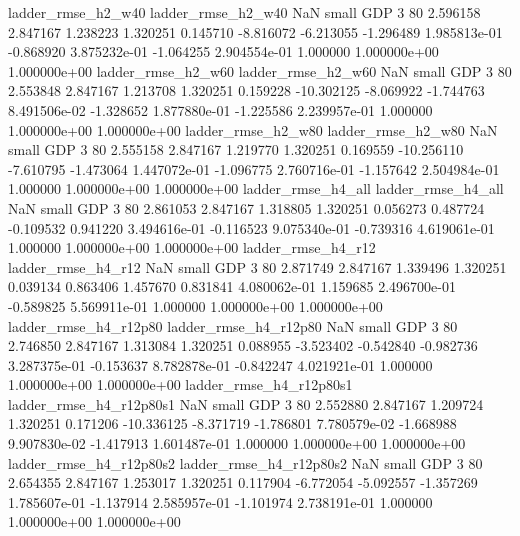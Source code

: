       ladder_rmse_h2_w40       ladder_rmse_h2_w40                   NaN      small      GDP                 3 80 2.596158       2.847167 1.238223       1.320251    0.145710     -8.816072     -6.213055    -1.296489   1.985813e-01 -0.868920 3.875232e-01    -1.064255   2.904554e-01            1.000000    1.000000e+00        1.000000e+00
      ladder_rmse_h2_w60       ladder_rmse_h2_w60                   NaN      small      GDP                 3 80 2.553848       2.847167 1.213708       1.320251    0.159228    -10.302125     -8.069922    -1.744763   8.491506e-02 -1.328652 1.877880e-01    -1.225586   2.239957e-01            1.000000    1.000000e+00        1.000000e+00
      ladder_rmse_h2_w80       ladder_rmse_h2_w80                   NaN      small      GDP                 3 80 2.555158       2.847167 1.219770       1.320251    0.169559    -10.256110     -7.610795    -1.473064   1.447072e-01 -1.096775 2.760716e-01    -1.157642   2.504984e-01            1.000000    1.000000e+00        1.000000e+00
      ladder_rmse_h4_all       ladder_rmse_h4_all                   NaN      small      GDP                 3 80 2.861053       2.847167 1.318805       1.320251    0.056273      0.487724     -0.109532     0.941220   3.494616e-01 -0.116523 9.075340e-01    -0.739316   4.619061e-01            1.000000    1.000000e+00        1.000000e+00
      ladder_rmse_h4_r12       ladder_rmse_h4_r12                   NaN      small      GDP                 3 80 2.871749       2.847167 1.339496       1.320251    0.039134      0.863406      1.457670     0.831841   4.080062e-01  1.159685 2.496700e-01    -0.589825   5.569911e-01            1.000000    1.000000e+00        1.000000e+00
   ladder_rmse_h4_r12p80    ladder_rmse_h4_r12p80                   NaN      small      GDP                 3 80 2.746850       2.847167 1.313084       1.320251    0.088955     -3.523402     -0.542840    -0.982736   3.287375e-01 -0.153637 8.782878e-01    -0.842247   4.021921e-01            1.000000    1.000000e+00        1.000000e+00
 ladder_rmse_h4_r12p80s1  ladder_rmse_h4_r12p80s1                   NaN      small      GDP                 3 80 2.552880       2.847167 1.209724       1.320251    0.171206    -10.336125     -8.371719    -1.786801   7.780579e-02 -1.668988 9.907830e-02    -1.417913   1.601487e-01            1.000000    1.000000e+00        1.000000e+00
 ladder_rmse_h4_r12p80s2  ladder_rmse_h4_r12p80s2                   NaN      small      GDP                 3 80 2.654355       2.847167 1.253017       1.320251    0.117904     -6.772054     -5.092557    -1.357269   1.785607e-01 -1.137914 2.585957e-01    -1.101974   2.738191e-01            1.000000    1.000000e+00        1.000000e+00
